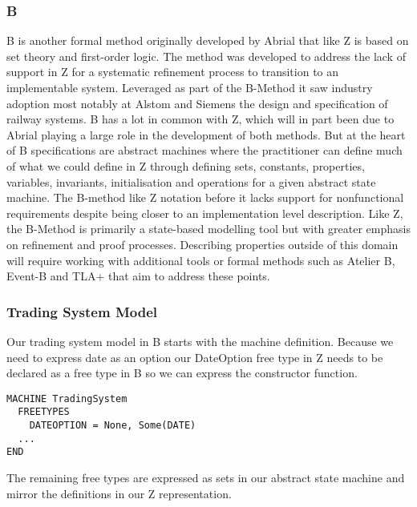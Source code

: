 \documentclass{article}
\begin{document}
\subsubsection*{B}

B is another formal method originally developed by Abrial that like Z is based on set theory and first-order logic. The method was developed to address the lack of support in Z for a systematic refinement process to transition to an implementable system. Leveraged as part of the B-Method it saw industry adoption most notably at Alstom and Siemens the design and specification of railway systems.  
\newline \newline
B has a lot in common with Z, which will in part been due to Abrial playing a large role in the development of both methods. But at the heart of B specifications are abstract machines where the practitioner can define much of what we could define in Z through defining sets, constants, properties, variables, invariants, initialisation and operations for a given abstract state machine.
\newline \newline
The B-method like Z notation before it lacks support for nonfunctional requirements despite being closer to an implementation level description. Like Z, the B-Method is primarily a state-based modelling tool but with greater emphasis on refinement and proof processes. Describing properties outside of this domain will require working with additional tools or formal methods such as Atelier B, Event-B and TLA+ that aim to address these points.

\subsubsection*{Trading System Model}

Our trading system model in B starts with the machine definition. Because we need to express date as an option our DateOption free type in Z needs to be declared as a free type in B so we can express the constructor function.
\begin{lstlisting}
MACHINE TradingSystem
  FREETYPES
    DATEOPTION = None, Some(DATE)
  ...
END
\end{lstlisting}

\hspace{-0.7cm} The remaining free types are expressed as sets in our abstract state machine and mirror the definitions in our Z representation.
\end{document}
